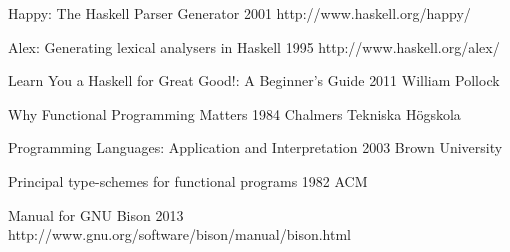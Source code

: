 
\begingroup
\renewcommand{\section}[2]{}%

\begin{thebibliography}{99}

  {Happy: The Haskell Parser Generator}
  {2001}
  {http://www.haskell.org/happy/}

  {Alex: Generating lexical analysers in Haskell}
  {1995}
  {http://www.haskell.org/alex/}

  {Learn You a Haskell for Great Good!: A Beginner's Guide}
  {2011}
  {William Pollock}

  {Why Functional Programming Matters}
  {1984}
  {Chalmers Tekniska Högskola}

  {Programming Languages: Application and Interpretation}
  {2003}
  {Brown University}

  {Principal type-schemes for functional programs}
  {1982}
  {ACM}

  {Manual for GNU Bison }
  {2013}
  {http://www.gnu.org/software/bison/manual/bison.html}

\end{thebibliography}

\endgroup